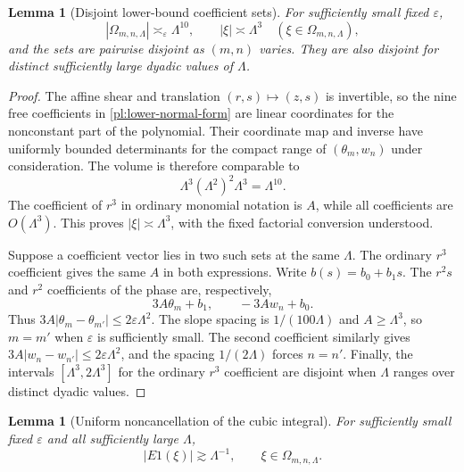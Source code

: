 \documentclass[11pt]{amsart}
\newtheorem{lemma}[theorem]{Lemma}
\theoremstyle{definition}
\theoremstyle{remark}
\numberwithin{equation}{section}
\begin{document}
\begin{lemma}[Disjoint lower-bound coefficient sets]\label{pl:lower-boxes}
For sufficiently small fixed $\varepsilon$,
\[
|\Omega_{m,n,\Lambda}|\asymp_\varepsilon\Lambda^{10},
\qquad |\xi|\asymp\Lambda^3\quad(\xi\in\Omega_{m,n,\Lambda}),
\]
and the sets are pairwise disjoint as $(m,n)$ varies. They are also disjoint for distinct sufficiently large dyadic values of $\Lambda$.
\end{lemma}

\begin{proof}
The affine shear and translation $(r,s)\mapsto(z,s)$ is invertible, so the nine free coefficients in \eqref{pl:lower-normal-form} are linear coordinates for the nonconstant part of the polynomial. Their coordinate map and inverse have uniformly bounded determinants for the compact range of $(\theta_m,w_n)$ under consideration. The volume is therefore comparable to
\[
\Lambda^3(\Lambda^2)^2\Lambda^3=\Lambda^{10}.
\]
The coefficient of $r^3$ in ordinary monomial notation is $A$, while all coefficients are $O(\Lambda^3)$. This proves $|\xi|\asymp\Lambda^3$, with the fixed factorial conversion understood.

Suppose a coefficient vector lies in two such sets at the same $\Lambda$. The ordinary $r^3$ coefficient gives the same $A$ in both expressions. Write $b(s)=b_0+b_1s$. The $r^2s$ and $r^2$ coefficients of the phase are, respectively,
\[
3A\theta_m+b_1,\qquad -3Aw_n+b_0.
\]
Thus $3A|\theta_m-\theta_{m'}|\le2\varepsilon\Lambda^2$. The slope spacing is $1/(100\Lambda)$ and $A\ge\Lambda^3$, so $m=m'$ when $\varepsilon$ is sufficiently small. The second coefficient similarly gives $3A|w_n-w_{n'}|\le2\varepsilon\Lambda^2$, and the spacing $1/(2\Lambda)$ forces $n=n'$. Finally, the intervals $[\Lambda^3,2\Lambda^3]$ for the ordinary $r^3$ coefficient are disjoint when $\Lambda$ ranges over distinct dyadic values.
\end{proof}

\begin{lemma}[Uniform noncancellation of the cubic integral]\label{pl:lower-stationary-phase}
For sufficiently small fixed $\varepsilon$ and all sufficiently large $\Lambda$,
\begin{equation}\label{pl:lower-amplitude}
|E1(\xi)|\gtrsim\Lambda^{-1},\qquad \xi\in\Omega_{m,n,\Lambda}.
\end{equation}
\end{lemma}
\end{document}
